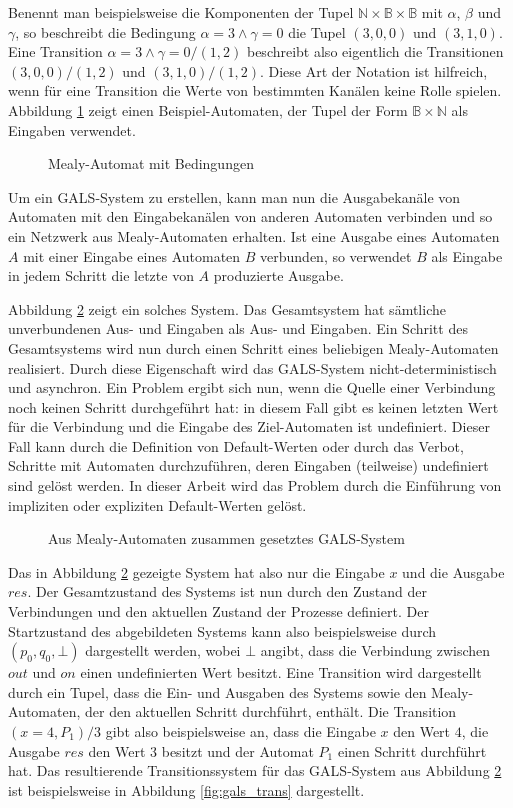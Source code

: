 Benennt man beispielsweise die Komponenten der Tupel $\mathbb{N}\times\mathbb{B}\times\mathbb{B}$ mit $\alpha$, $\beta$ und $\gamma$, so beschreibt die Bedingung $\alpha=3\land\gamma=0$ die Tupel $(3,0,0)$ und $(3,1,0)$.
Eine Transition $\alpha=3\land\gamma=0/(1,2)$ beschreibt also eigentlich die Transitionen $(3,0,0)/(1,2)$ und $(3,1,0)/(1,2)$.
Diese Art der Notation ist hilfreich, wenn für eine Transition die Werte von bestimmten Kanälen keine Rolle spielen.
Abbildung \ref{fig:mealy2} zeigt einen Beispiel-Automaten, der Tupel der Form $\mathbb{B}\times\mathbb{N}$ als Eingaben verwendet.

\begin{figure}[h]
  \centering
  
  \caption{Mealy-Automat mit Bedingungen}
  \label{fig:mealy2}
\end{figure}

Um ein GALS-System zu erstellen, kann man nun die Ausgabekanäle von Automaten mit den Eingabekanälen von anderen Automaten verbinden und so ein Netzwerk aus Mealy-Automaten erhalten.
Ist eine Ausgabe eines Automaten $A$ mit einer Eingabe eines Automaten $B$ verbunden, so verwendet $B$ als Eingabe in jedem Schritt die letzte von $A$ produzierte Ausgabe.

Abbildung \ref{fig:mealy3} zeigt ein solches System.
Das Gesamtsystem hat sämtliche unverbundenen Aus- und Eingaben als Aus- und Eingaben.
Ein Schritt des Gesamtsystems wird nun durch einen Schritt eines beliebigen Mealy-Automaten realisiert.
Durch diese Eigenschaft wird das GALS-System nicht-deterministisch und asynchron.
Ein Problem ergibt sich nun, wenn die Quelle einer Verbindung noch keinen Schritt durchgeführt hat: in diesem Fall gibt es keinen letzten Wert für die Verbindung und die Eingabe des Ziel-Automaten ist undefiniert.
Dieser Fall kann durch die Definition von Default-Werten oder durch das Verbot, Schritte mit Automaten durchzuführen, deren Eingaben (teilweise) undefiniert sind gelöst werden.
In dieser Arbeit wird das Problem durch die Einführung von impliziten oder expliziten Default-Werten gelöst.
\begin{figure}[h]
  \centering
  
  \caption{Aus Mealy-Automaten zusammen gesetztes GALS-System}
  \label{fig:mealy3}
\end{figure}

Das in Abbildung \ref{fig:mealy3} gezeigte System hat also nur die Eingabe $x$ und die Ausgabe $\mathit{res}$.
Der Gesamtzustand des Systems ist nun durch den Zustand der Verbindungen und den aktuellen Zustand der Prozesse definiert.
Der Startzustand des abgebildeten Systems kann also beispielsweise durch $(p_0,q_0,\bot)$ dargestellt werden, wobei $\bot$ angibt, dass die Verbindung zwischen $\mathit{out}$ und $\mathit{on}$ einen undefinierten Wert besitzt.
Eine Transition wird dargestellt durch ein Tupel, dass die Ein- und Ausgaben des Systems sowie den Mealy-Automaten, der den aktuellen Schritt durchführt, enthält.
Die Transition $(x=4,P_1)/3$ gibt also beispielsweise an, dass die Eingabe $x$ den Wert $4$, die Ausgabe $\mathit{res}$ den Wert $3$ besitzt und der Automat $P_1$ einen Schritt durchführt hat.
Das resultierende Transitionssystem für das GALS-System aus Abbildung \ref{fig:mealy3} ist beispielsweise in Abbildung \ref{fig:gals_trans} dargestellt.

